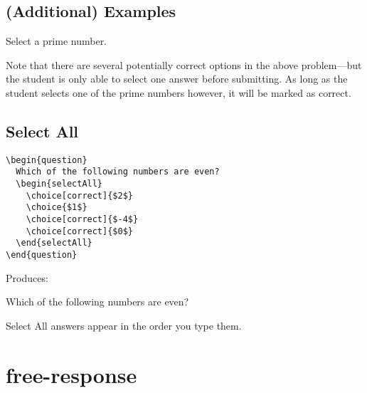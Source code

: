 \documentclass{ximera}
\begin{document}
\subsection{(Additional) Examples}


\begin{problem}
Select a prime number.
\begin{multipleChoice}
\end{multipleChoice}
\end{problem}

Note that there are several potentially correct options in the above
problem---but the student is only able to select one answer before submitting.
As long as the student selects one of the prime numbers however, it will be
marked as correct.

\subsection{Select All}

\begin{example}
\begin{verbatim}
\begin{question}
  Which of the following numbers are even?
  \begin{selectAll}
    \choice[correct]{$2$}
    \choice{$1$}
    \choice[correct]{$-4$}
    \choice[correct]{$0$}
  \end{selectAll}
\end{question}
\end{verbatim}
\end{example}

Produces:

\begin{question}
  Which of the following numbers are even?
  \begin{selectAll}
  \end{selectAll}
\end{question}

\begin{remark}
  Select All answers appear in the order you type them.
\end{remark}



\section{free-response}
\end{document}
